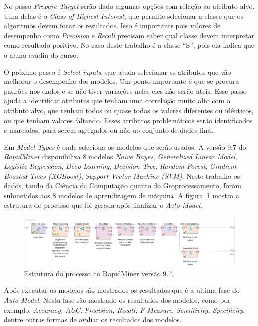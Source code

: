 \documentclass[diss,capa]{texufpel}
\begin{document}
No passo \textit{Prepare Target} serão dado algumas opções com relação ao atributo alvo. Uma delas é o \textit{Class of Highest Interest}, que permite selecionar a classe que os algoritmos devem focar os resultados. Isso é importante pois valores de desempenho como \textit{Precision} e \textit{Recall} precisam saber qual classe devem interpretar como resultado positivo. No caso deste trabalho é a classe ``S'', pois ela indica que o aluno evadiu do curso.

O próximo passo é \textit{Select inputs}, que ajuda selecionar os atributos que vão melhorar o desempenho dos modelos. Um ponto importante é que se procura padrões nos dados e se não tiver variações neles eles não serão uteis. Esse passo ajuda a identificar atributos que tenham uma correlação muito alto com o atributo alvo, que tenham todos ou quase todos os valores diferentes ou idênticos, ou que tenham valores faltando. Esses atributos problemáticos serão identificados e marcados, para serem agregados ou não ao conjunto de dados final.

Em \textit{Model Types} é onde seleciona os modelos que serão usados. A versão 9.7 do \textit{RapidMiner} disponibiliza 8 modelos \textit{Naive Bayes}, \textit{Generalized Linear Model}, \textit{Logistic Regression}, \textit{Deep Learning}, \textit{Decision Tree}, \textit{Random Forest}, \textit{Gradient Boosted Trees (XGBoost)}, \textit{Support Vector Machine (SVM)}. Neste trabalho os dados, tando da Ciência da Computação quanto do Geoprocessamento, foram submetidos aos 8 modelos de aprendizagem de máquina. A figura~\ref{fig:processo-rapidminer} mostra a estrutura do processo que foi gerada após finalizar o \textit{Auto Model}.

\begin{figure}[htbp]
\centering \includegraphics[scale=.35]{imagens/processo-rapidminer.png}
\caption{Estrutura do processo no RapidMiner versão 9.7.}
\label{fig:processo-rapidminer}
\end{figure}

Após executar os modelos são mostrados os resultados que é a ultima fase do \textit{Auto Model}. Nesta fase são mostrado os resultados dos modelos, como por exemplo: \textit{Accuracy, AUC, Precision, Recall, F-Measure, Sensitivity, Specificity}, dentre outras formas de avaliar os resultados dos modelos.
\end{document}
